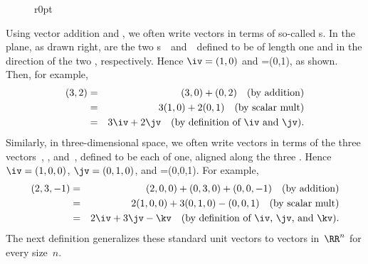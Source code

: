 \begin{wrapfigure}r{0pt}
\end{wrapfigure}%
Using vector addition and , we often write vectors in terms of so-called s.
In the plane, as drawn right, are the two s~\iv\ and~\jv\ defined to be of length one and in the direction of the two , respectively.
Hence \(\iv=(1,0)\) and \jv=(0,1), as shown.
%
Then, for example,
\begin{eqnarray*}
(3,2)&=&(3,0)+(0,2)\quad(\text{by addition})
\\&=&3(1,0)+2(0,1)\quad(\text{by scalar mult})
\\&=&3\iv+2\jv \quad(\text{by definition of \iv\ and \jv}).
\end{eqnarray*}
%
Similarly, in three-dimensional space, we often write vectors in terms of the three vectors~\iv, \jv, and~\kv, defined to be each of  one, aligned along the three .
Hence \(\iv=(1,0,0)\), \(\jv=(0,1,0)\), and \kv=(0,0,1).
For example,
\begin{eqnarray*}
(2,3,-1)&=&(2,0,0)+(0,3,0)+(0,0,-1)\quad(\text{by addition})
\\&=&2(1,0,0)+3(0,1,0)-(0,0,1)\quad(\text{by scalar mult})
\\&=&2\iv+3\jv-\kv \quad(\text{by definition of \iv, \jv, and \kv}).
\end{eqnarray*}
The next definition generalizes these standard unit vectors to vectors in~\(\RR^n\) for every size~\(n\).


